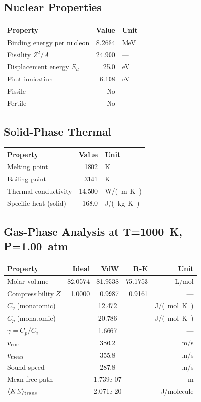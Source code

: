 \documentclass[11pt,a4paper]{article}
\begin{document}
\subsection{Nuclear Properties}
\begin{tabular}{lrl}
  \toprule
  Property & Value & Unit \\
  \midrule
  Binding energy per nucleon & 8.2684 & \si{MeV} \\
  Fissility $Z^2/A$ & 24.900 & --- \\
  Displacement energy $E_d$ & 25.0 & \si{eV} \\
  First ionisation & 6.108 & \si{eV} \\
  Fissile & No & --- \\
  Fertile & No & --- \\
  \bottomrule
\end{tabular}

\subsection{Solid-Phase Thermal}
\begin{tabular}{lrl}
  \toprule
  Property & Value & Unit \\
  \midrule
  Melting point & 1802 & \si{K} \\
  Boiling point & 3141 & \si{K} \\
  Thermal conductivity & 14.500 & \si{W/(m.K)} \\
  Specific heat (solid) & 168.0 & \si{J/(kg.K)} \\
  \bottomrule
\end{tabular}

\subsection{Gas-Phase Analysis at T=\SI{1000}{K}, P=\SI{1.00}{atm}}
\begin{tabular}{lrrrr}
  \toprule
  Property & Ideal & VdW & R-K & Unit \\
  \midrule
  Molar volume & 82.0574 & 81.9538 & 75.1753 & \si{L/mol} \\
  Compressibility $Z$ & 1.0000 & 0.9987 & 0.9161 & --- \\
  \midrule
  $C_v$ (monatomic) & \multicolumn{3}{c}{12.472} & \si{J/(mol.K)} \\
  $C_p$ (monatomic) & \multicolumn{3}{c}{20.786} & \si{J/(mol.K)} \\
  $\gamma = C_p/C_v$ & \multicolumn{3}{c}{1.6667} & --- \\
  $v_{\rm rms}$ & \multicolumn{3}{c}{386.2} & \si{m/s} \\
  $v_{\rm mean}$ & \multicolumn{3}{c}{355.8} & \si{m/s} \\
  Sound speed & \multicolumn{3}{c}{287.8} & \si{m/s} \\
  Mean free path & \multicolumn{3}{c}{1.739e-07} & \si{m} \\
  $\langle KE \rangle_{\rm trans}$ & \multicolumn{3}{c}{2.071e-20} & \si{J/molecule} \\
  \bottomrule
\end{tabular}
\end{document}
